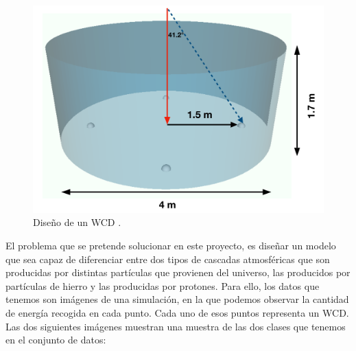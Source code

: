 \begin{figure}[H]
	\includegraphics[scale=.1]{imagenes/01_Introduccion/wcd.png}
	\centering
	\caption{Diseño de un WCD \cite{gonzalez2021tackling}.}
	\label{fig:wcdschema}
\end{figure}

El problema que se pretende solucionar en este proyecto, es diseñar un modelo que sea capaz de diferenciar entre dos tipos de cascadas atmosféricas que son producidas por distintas partículas que provienen del universo, las producidos por partículas de hierro y las producidas por protones. Para ello, los datos que tenemos son imágenes de una simulación, en la que podemos observar la cantidad de energía recogida en cada punto. Cada uno de esos puntos representa un WCD. Las dos siguientes imágenes muestran una muestra de las dos clases que tenemos en el conjunto de datos:

